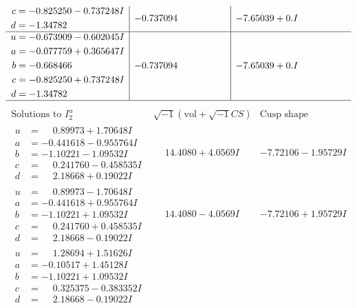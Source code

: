\documentclass[1p]{elsarticle_modified}
\theoremstyle{definition}
\newcommand{\I}{\sqrt{-1}}
\begin{document}
$$\begin{array}{c|c|c}
\begin{aligned}
c &= -0.825250 - 0.737248 I \\
d &= -1.34782\phantom{ +0.000000I}\end{aligned}
 & -0.737094\phantom{ +0.000000I} & -7.65039 + 0. I\phantom{ +0.000000I} \\ \hline\begin{aligned}
u &= -0.673909 - 0.602045 I \\
a &= -0.077759 + 0.365647 I \\
b &= -0.668466\phantom{ +0.000000I} \\
c &= -0.825250 + 0.737248 I \\
d &= -1.34782\phantom{ +0.000000I}\end{aligned}
 & -0.737094\phantom{ +0.000000I} & -7.65039 + 0. I\phantom{ +0.000000I}\\
 \hline 
 \end{array}$$\newpage$$\begin{array}{c|c|c}  
\text{Solutions to }I^u_{2}& \I (\text{vol} + \sqrt{-1}CS) & \text{Cusp shape}\\
 \hline 
\begin{aligned}
u &= \phantom{-}0.89973 + 1.70648 I \\
a &= -0.441618 - 0.955764 I \\
b &= -1.10221 - 1.09532 I \\
c &= \phantom{-}0.241760 - 0.458535 I \\
d &= \phantom{-}2.18668 + 0.19022 I\end{aligned}
 & \phantom{-}14.4080 + 4.0569 I & -7.72106 - 1.95729 I \\ \hline\begin{aligned}
u &= \phantom{-}0.89973 - 1.70648 I \\
a &= -0.441618 + 0.955764 I \\
b &= -1.10221 + 1.09532 I \\
c &= \phantom{-}0.241760 + 0.458535 I \\
d &= \phantom{-}2.18668 - 0.19022 I\end{aligned}
 & \phantom{-}14.4080 - 4.0569 I & -7.72106 + 1.95729 I \\ \hline\begin{aligned}
u &= \phantom{-}1.28694 + 1.51626 I \\
a &= -0.10517 + 1.45128 I \\
b &= -1.10221 + 1.09532 I \\
c &= \phantom{-}0.325375 - 0.383352 I \\
d &= \phantom{-}2.18668 - 0.19022 I\end{aligned}

\end{array}$$
\end{document}
